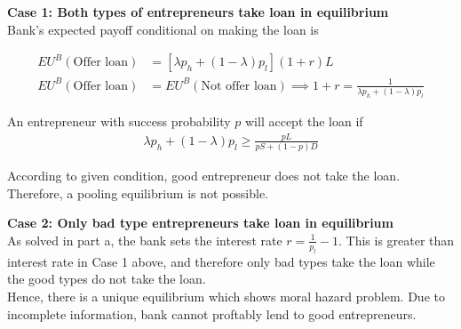 \textbf{Case 1: Both types of entrepreneurs take loan in equilibrium}\\

Bank's expected payoff conditional on making the loan is

\begin{align*}
    EU^B(\text{Offer loan}) &= [\lambda p_h  + (1- \lambda)p_l ] (1+r) L\\
    EU^B(\text{Offer loan}) &= EU^B(\text{Not offer loan}) \implies 1+r = \frac{1}{\lambda p_h  + (1- \lambda)p_l } 
\end{align*}

An entrepreneur with success probability $p$ will accept the loan if 
\begin{align*}
    \lambda p_h  + (1- \lambda)p_l \ge \frac{p L}{p S + (1-p)D}
\end{align*}

According to given condition, good entrepreneur does not take the loan. Therefore, a pooling equilibrium is not possible.

\textbf{Case 2: Only bad type entrepreneurs take loan in equilibrium}\\

As solved in part a, the bank sets the interest rate $r = \frac{1}{p_l}-1$. This is greater than interest rate in Case 1 above, and therefore only bad types take the loan while the good types do not take the loan.\\

Hence, there is a unique equilibrium which shows moral hazard problem. Due to incomplete information, bank cannot proftably lend to good entrepreneurs. 